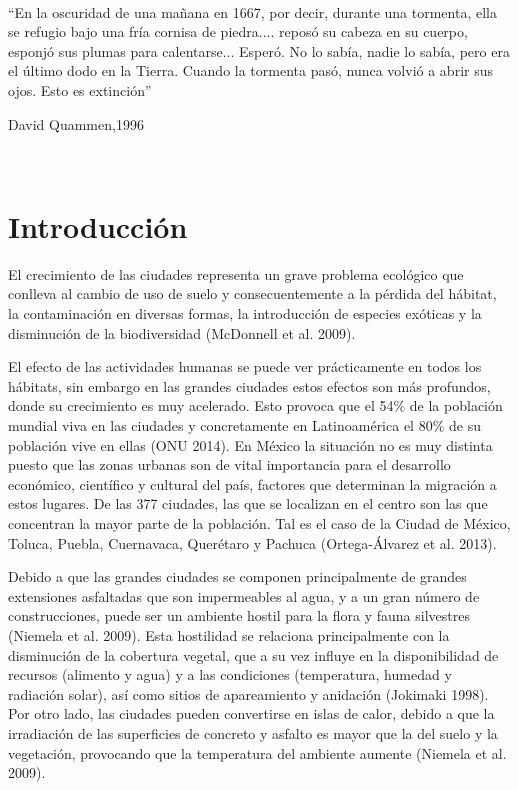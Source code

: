 \documentclass[letterpaper,12pt]{article}
\begin{document}
\begin{abstract}
\end{abstract}\\[3cm]

\newpage
{\linespread{1}
\epigraph{``En la oscuridad de una mañana en 1667, por decir, durante una tormenta, ella se refugio bajo una fría cornisa de piedra.... reposó su cabeza en su cuerpo, esponjó sus plumas para calentarse...
Esperó. No lo sabía, nadie lo sabía, pero era el último dodo en la Tierra.
Cuando la tormenta pasó, nunca volvió a abrir sus ojos. Esto es extinción''}{David Quammen,1996}\\}
\section{Introducción}
El crecimiento de las ciudades representa un grave problema ecológico que conlleva al cambio de uso de suelo y consecuentemente a la pérdida del hábitat, la contaminación en diversas formas, la introducción de especies exóticas y la disminución de la biodiversidad (McDonnell et al. 2009).

El efecto de las actividades humanas se puede ver prácticamente en todos los hábitats, sin embargo en las grandes ciudades estos efectos son más profundos, donde su crecimiento es muy acelerado. Esto provoca que el 54\%  de la población mundial viva en las ciudades  y concretamente en Latinoamérica el 80\% de su población vive en ellas (ONU 2014).
En México la situación no es muy distinta puesto que las zonas urbanas son de vital importancia para el desarrollo económico, científico y cultural del país, factores que determinan la migración a estos lugares. De las  377 ciudades, las que se localizan en el centro son las que concentran la mayor parte de la población. Tal es el caso de la Ciudad de México, Toluca, Puebla, Cuernavaca, Querétaro y Pachuca (Ortega-Álvarez et al. 2013).

Debido a que las grandes ciudades se componen principalmente de grandes extensiones asfaltadas que son impermeables al agua, y a un gran número de construcciones, puede ser un ambiente hostil para la flora y fauna silvestres (Niemela et al. 2009). Esta hostilidad se relaciona principalmente con la disminución de la cobertura vegetal, que a su vez  influye en la disponibilidad de recursos (alimento y agua) y a las condiciones (temperatura, humedad y radiación solar), así como sitios de apareamiento y anidación (Jokimaki 1998). Por otro lado, las ciudades pueden convertirse en islas de calor, debido a que la irradiación de las superficies de concreto y asfalto es mayor que la del suelo y la vegetación, provocando que la temperatura del ambiente aumente (Niemela et al. 2009).
\end{document}
